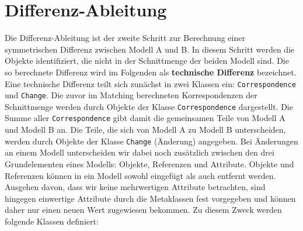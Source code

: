 \section{Differenz-Ableitung}
\label{sec:diff:derivation}

Die Differenz-Ableitung ist der zweite Schritt zur Berechnung einer symmetrischen Differenz zwischen
Modell A und B. In diesem Schritt werden die Objekte identifiziert, die nicht in der Schnittmenge
der beiden Modell sind. Die so berechnete Differenz wird im Folgenden als \textbf{technische
Differenz} bezeichnet. Eine technische Differenz teilt sich zunächst in zwei Klassen ein:
\texttt{Correspondence} und \texttt{Change}. Die zuvor im Matching berechneten Korrespondenzen der
Schnittmenge werden durch Objekte der Klasse \texttt{Correspondence} dargestellt. Die Summe aller
\texttt{Correspondence} gibt damit die gemeinsamen Teile von Modell A und Modell B an. Die Teile,
die sich von Modell A zu Modell B unterscheiden, werden durch Objekte der Klasse \texttt{Change}
(Änderung) angegeben. Bei Änderungen an einem Modell unterscheiden wir dabei noch zusätzlich
zwischen den drei Grundelementen eines Modells: Objekte, Referenzen und Attribute. Objekte und
Referenzen können in ein Modell sowohl eingefügt als auch entfernt werden. Ausgehen davon, dass wir
keine mehrwertigen Attribute betrachten, sind hingegen einwertige Attribute durch die Metaklassen
fest vorgegeben und können daher nur einen neuen Wert zugewiesen bekommen. Zu diesem Zweck werden
folgende Klassen definiert:

